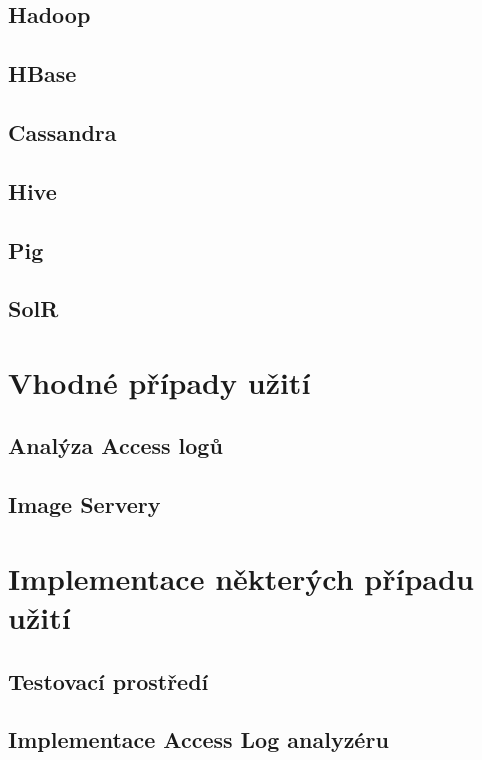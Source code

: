 \documentclass[thesis=M,czech]{FITthesis}[2012/06/26]
\begin{document}
\section{Hadoop}
\section{HBase}
\section{Cassandra}
\section{Hive}
\section{Pig}
\section{SolR}


\chapter{Vhodné případy užití}
\section{Analýza Access logů}
\section{Image Servery}


\chapter{Implementace některých případu užití}
\section{Testovací prostředí}
\section{Implementace Access Log analyzéru}

\begin{conclusion}
\end{conclusion}

\nocite{*}


\end{document}
